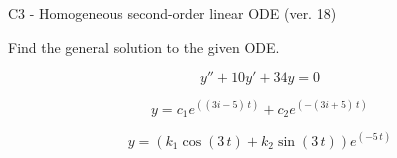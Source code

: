 \begin{exercise}
  \begin{exerciseTitle}C3 - Homogeneous second-order linear ODE (ver. 18)\end{exerciseTitle}
  \begin{exerciseStatement}
    
Find the general solution to the given ODE.

    
\[y''+10y'+34y = 0\]

  \end{exerciseStatement}
  \begin{exerciseAnswer}
    
\[y= c_{1} e^{\left(\left(3 i - 5\right) \, t\right)} + c_{2} e^{\left(-\left(3 i + 5\right) \, t\right)}\]

    
\[y= {\left(k_{1} \cos\left(3 \, t\right) + k_{2} \sin\left(3 \, t\right)\right)} e^{\left(-5 \, t\right)}\]

  \end{exerciseAnswer}
\end{exercise}